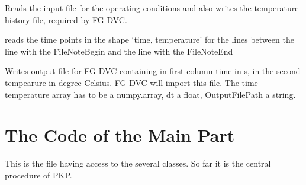 \documentclass[letterpaper,10pt,english]{sphinxmanual}
\begin{document}

\begin{fulllineitems}
\label{FittingClasses:ReadInputFiles.OperCondInput}
Reads the input file for the operating conditions and also writes the temperature-history file, required by FG-DVC.

\begin{fulllineitems}
\label{FittingClasses:ReadInputFiles.OperCondInput.getTimePoints}
reads the time points in the shape `time, temperature' for the lines between the line with the FileNoteBegin and the line with the FileNoteEnd

\end{fulllineitems}


\begin{fulllineitems}
\label{FittingClasses:ReadInputFiles.OperCondInput.writeFGDVCtTHist}
Writes output file for FG-DVC containing in first column time in s, in the second tempearure in degree Celsius. FG-DVC will import this file. The time-temperature array has to be a numpy.array, dt a float, OutputFilePath a string.

\end{fulllineitems}


\end{fulllineitems}



\chapter{The Code of the Main Part}
\label{MainProgramCode::doc}\label{MainProgramCode:the-code-of-the-main-part}
This is the file having access to the several classes. So far it is the central procedure of PKP.
\end{document}
